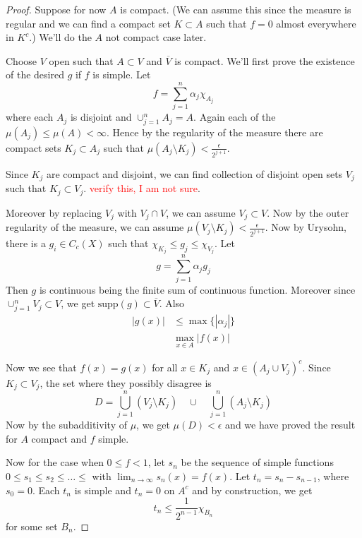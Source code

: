 \begin{proof}
  Suppose for now $A$ is compact. (We can assume this since the
    measure is regular and we can find a compact set $K \subset A$ such
  that $f = 0$ almost everywhere in $K^c$.) We'll do the $A$ not
  compact case later.

  Choose $V$ open such that $ A \subset V$ and $\overline{V}$ is
  compact. We'll first prove the existence of the desired $g$ if $f$
  is simple. Let \[
    f = \sum_{j = 1}^{n} \alpha_j \chi_{A_j}
  \]
  where each $A_j$ is disjoint and $\cup_{j = 1}^{n}A_j = A$. Again
  each of the $\mu(A_j) \le \mu(A) < \infty$. Hence by the regularity
  of the measure there are compact sets $K_j \subset A_j$ such that $
  \mu(A_j \setminus K_j) < \frac{\epsilon}{2^{j+1}}$.

  Since $K_j$ are compact and disjoint, we can find collection of
  disjoint open sets $V_j$ such that $K_j \subset V_j$.
  \textcolor{red}{verify this, I am not sure}.

  Moreover by replacing $V_j$ with $V_j \cap V$, we can assume $V_j \subset V$.
  Now by the outer regularity of the measure, we can assume $\mu(V_j
  \setminus K_j) < \frac{\epsilon}{2^{j+1}}$. Now by Urysohn, there is a
  $g_i \in C_c(X)$ such that $\chi_{K_j} \le g_j \le \chi_{V_j}$. Let   \[
    g = \sum_{j = 1}^{n} \alpha_j g_j
  \]
  Then $g$ is continuous being the finite sum of continuous function.
  Moreover since $\cup_{j = 1}^{n}V_j \subset V$, we get
  $\textrm{supp}(g) \subset \overline{V}$. Also
  \begin{align*}
    |g(x)| & \le \max \{ |\alpha_j| \} \\
    & \max_{x \in A} | f(x)|
  \end{align*}

  Now we see that $f(x) = g(x)$ for all $x \in K_j$ and $x \in
  (A_j \cup V_j)^c$. Since $K_j \subset V_j$, the set where they possibly
  disagree is $$D = \bigcup_{j = 1}^{n}(V_j \setminus K_j) \quad \cup
  \quad \bigcup_{j = 1}^{n}(A_j \setminus K_j)$$
  Now by the subadditivity of $\mu$, we get $\mu(D) < \epsilon$ and
  we have proved the result for $A$ compact and $f$ simple.

  Now for the case when $0\le f < 1$, let $s_n$ be the
  sequence of simple functions $0 \le s_1 \le s_2 \le \ldots \le $
  with $\lim_{n \to \infty} s_n(x) = f(x)$. Let $t_n = s_n -
  s_{n-1}$, where $s_0 = 0$. Each $t_n$ is simple and $t_n = 0$ on
  $A^c$ and by construction, we get \[
    t_n \le \frac{1}{2^{n-1}} \chi_{B_n}
  \]
  for some  set $B_n$.


\end{proof}
